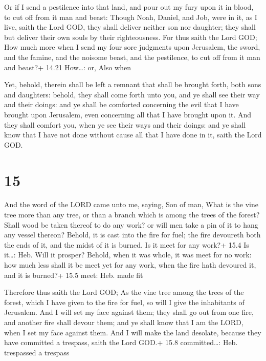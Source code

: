  Or if I send a pestilence into that land, and pour out
my fury upon it in blood, to cut off from it man and beast:
 Though Noah, Daniel, and Job, were in it, as I live, saith
the Lord GOD, they shall deliver neither son nor daughter; they shall
but deliver their own souls by their righteousness.  For
thus saith the Lord GOD; How much more when I send my four sore
judgments upon Jerusalem, the sword, and the famine, and the noisome
beast, and the pestilence, to cut off from it man and beast?+ 14.21
How\ldots: or, Also when

 Yet, behold, therein shall be left a remnant that shall
be brought forth, both sons and daughters: behold, they shall come forth
unto you, and ye shall see their way and their doings: and ye shall be
comforted concerning the evil that I have brought upon Jerusalem, even
concerning all that I have brought upon it.  And they shall
comfort you, when ye see their ways and their doings: and ye shall know
that I have not done without cause all that I have done in it, saith the
Lord GOD.

\hypertarget{section-14}{%
\section{15}\label{section-14}}

 And the word of the LORD came unto me, saying, 
Son of man, What is the vine tree more than any tree, or than a branch
which is among the trees of the forest?  Shall wood be taken
thereof to do any work? or will men take a pin of it to hang any vessel
thereon?  Behold, it is cast into the fire for fuel; the
fire devoureth both the ends of it, and the midst of it is burned. Is it
meet for any work?+ 15.4 Is it\ldots: Heb. Will it prosper? 
Behold, when it was whole, it was meet for no work: how much less shall
it be meet yet for any work, when the fire hath devoured it, and it is
burned?+ 15.5 meet: Heb. made fit

 Therefore thus saith the Lord GOD; As the vine tree among
the trees of the forest, which I have given to the fire for fuel, so
will I give the inhabitants of Jerusalem.  And I will set my
face against them; they shall go out from one fire, and another fire
shall devour them; and ye shall know that I am the LORD, when I set my
face against them.  And I will make the land desolate,
because they have committed a trespass, saith the Lord GOD.+ 15.8
committed\ldots: Heb. trespassed a trespass

